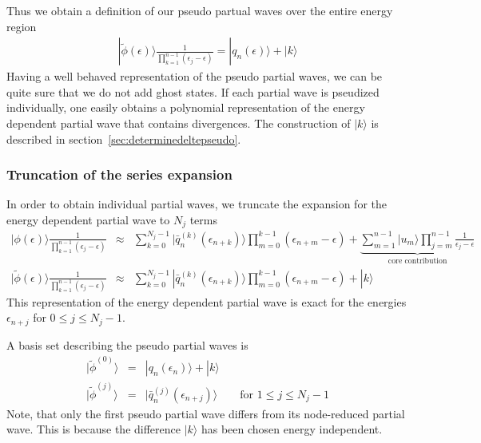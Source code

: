 \documentclass[11pt,a4paper]{report}
\begin{document}
Thus we obtain a definition of our pseudo partual waves over the
entire energy region
\begin{eqnarray}
|\tilde{\phi}(\epsilon)\rangle
\frac{1}{\prod_{k=1}^{n-1}(\epsilon_j-\epsilon)}
=|q_n(\epsilon)\rangle+|k\rangle
\end{eqnarray}
Having a well behaved representation of the pseudo partial waves, we
can be quite sure that we do not add ghost states. If each partial
wave is pseudized individually, one easily obtains a polynomial
representation of the energy dependent partial wave that contains
divergences.  The construction of $|k\rangle$ is described in
section~\ref{sec:determinedeltepseudo}.

\subsubsection{Truncation of the series expansion}
In order to obtain individual partial waves, we truncate the expansion
for the energy dependent partial wave to $N_j$ terms
\begin{eqnarray}
|\phi(\epsilon)\rangle
\frac{1}{\prod_{k=1}^{n-1}(\epsilon_j-\epsilon)}
&\approx&
\sum_{k=0}^{N_j-1}
|\bar{q}_{n}^{(k)}(\epsilon_{n+k})\rangle
\prod_{m=0}^{k-1}(\epsilon_{n+m}-\epsilon)
+
\underbrace{
\sum_{m=1}^{n-1}|u_m\rangle\prod_{j=m}^{n-1}\frac{1}{\epsilon_j-\epsilon}
}_{\text{core contribution}}
\nonumber\\
|\tilde{\phi}(\epsilon)\rangle\frac{1}{\prod_{k=1}^{n-1}(\epsilon_j-\epsilon)}
&\approx&
\sum_{k=0}^{N_j-1}
|\bar{q}_{n}^{(k)}(\epsilon_{n+k})\rangle
\prod_{m=0}^{k-1}(\epsilon_{n+m}-\epsilon)
+|k\rangle
\end{eqnarray}
This representation of the energy dependent partial wave is exact for
the energies $\epsilon_{n+j}$ for $0\le j\le N_j-1$.

A basis set describing the pseudo partial waves is
\begin{eqnarray}
|\tilde{\phi}^{(0)}\rangle&=&|q_n(\epsilon_n)\rangle+|k\rangle
\nonumber\\
|\tilde{\phi}^{(j)}\rangle&=&|\bar{q}_n^{(j)}(\epsilon_{n+j})\rangle
\qquad\text{for $1\le j\le N_j-1$}
\end{eqnarray}
Note, that only the first pseudo partial wave differs from its
node-reduced partial wave. This is because the difference $|k\rangle$
has been chosen energy independent.
\end{document}
